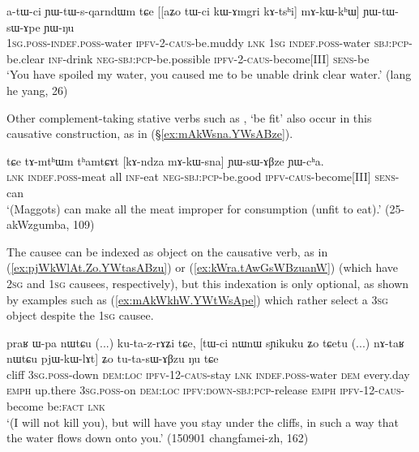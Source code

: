  \begin{exe}
\ex  \label{ex:mAkWkhW.YWtWsApe}
\gll a-tɯ-ci ɲɯ-tɯ-s-qarndɯm tɕe [[aʑo tɯ-ci kɯ-ɤmgri kɤ-tsʰi] mɤ-kɯ-kʰɯ] ɲɯ-tɯ-sɯ-ɤpe ɲɯ-ŋu  \\
\textsc{1sg}.\textsc{poss}-\textsc{indef}.\textsc{poss}-water \textsc{ipfv}-\textsc{2}-\textsc{caus}-be.muddy \textsc{lnk} \textsc{1sg} \textsc{indef}.\textsc{poss}-water \textsc{sbj}:\textsc{pcp}-be.clear \textsc{inf}-drink \textsc{neg}-\textsc{sbj}:\textsc{pcp}-be.possible \textsc{ipfv}-2-\textsc{caus}-become[III] \textsc{sens}-be \\
\glt `You have spoiled my water, you caused me to be unable drink clear water.' (lang he yang, 26)
\end{exe}

Other complement-taking stative verbs such as , `be fit' also occur in this causative construction, as in (§\ref{ex:mAkWsna.YWsABze}).

 \begin{exe}
\ex  \label{ex:mAkWsna.YWsABze}
\gll tɕe tɤ-mtʰɯm tʰamtɕɤt [kɤ-ndza mɤ-kɯ-sna] ɲɯ-sɯ-ɤβze ɲɯ-cʰa. \\
\textsc{lnk} \textsc{indef}.\textsc{poss}-meat all \textsc{inf}-eat \textsc{neg}-\textsc{sbj}:\textsc{pcp}-be.good \textsc{ipfv}-\textsc{caus}-become[III] \textsc{sens}-can \\
\glt `(Maggots) can make all the meat improper for consumption (unfit to eat).' (25-akWzgumba, 109)
\end{exe}

The causee can be indexed as object on the causative verb, as in (\ref{ex:pjWkWlAt.Zo.YWtasABzu}) or (\ref{ex:kWra.tAwGsWBzuanW}) (which have \textsc{2sg} and \textsc{1sg} causees, respectively), but this indexation is only optional, as shown by examples such as (\ref{ex:mAkWkhW.YWtWsApe}) which rather select a \textsc{3sg} object despite the \textsc{1sg} causee.

 \begin{exe}
\ex  \label{ex:pjWkWlAt.Zo.YWtasABzu}
\gll praʁ ɯ-pa nɯtɕu (...) ku-ta-z-rɤʑi tɕe, [tɯ-ci nɯnɯ sɲikuku ʑo tɕetu (...) nɤ-taʁ nɯtɕu pjɯ-kɯ-lɤt] ʑo tu-ta-sɯ-ɤβzu ŋu tɕe \\
cliff \textsc{3sg}.\textsc{poss}-down \textsc{dem}:\textsc{loc} { } \textsc{ipfv}-1\fl{}2-\textsc{caus}-stay \textsc{lnk} \textsc{indef}.\textsc{poss}-water \textsc{dem} every.day \textsc{emph} up.there { } \textsc{3sg}.\textsc{poss}-on \textsc{dem}:\textsc{loc} \textsc{ipfv}:\textsc{down}-\textsc{sbj}:\textsc{pcp}-release \textsc{emph} \textsc{ipfv}-1\fl{}2-\textsc{caus}-become be:\textsc{fact} \textsc{lnk} \\
\glt `(I will not kill you), but will have you stay under the cliffs, in such a way that the water flows down onto you.' (150901 changfamei-zh, 162)
\end{exe}

